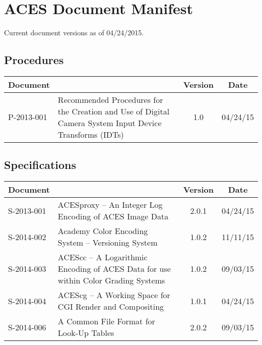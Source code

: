 \documentclass[10pt]{academydoc}
\begin{document}
\regularsectionformat

\section*{ACES Document Manifest}
Current document versions as of 04/24/2015.

\subsection*{Procedures}
\begin{tabularx}{\linewidth}{|l X|c|c|}
\hline
\textbf{Document} & & \textbf{Version} & \textbf{Date} \\ \hline
P-2013-001 & Recommended Procedures for the Creation and Use of Digital Camera System Input Device Transforms (IDTs) & 1.0 & 04/24/15 \\ \hline
\end{tabularx}

\subsection*{Specifications}
\begin{tabularx}{\linewidth}{|l X|c|c|}
\hline
\textbf{Document} & & \textbf{Version} & \textbf{Date} \\ \hline
S-2013-001 & ACESproxy -- An Integer Log Encoding of ACES Image Data & 2.0.1 & 04/24/15 \\ \hline
S-2014-002 & Academy Color Encoding System -- Versioning System & 1.0.2 & 11/11/15 \\ \hline
S-2014-003 & ACEScc -- A Logarithmic Encoding of ACES Data for use within Color Grading Systems & 1.0.2 & 09/03/15 \\ \hline
S-2014-004 & ACEScg -- A Working Space for CGI Render and Compositing & 1.0.1 & 04/24/15 \\ \hline
S-2014-006 & A Common File Format for Look-Up Tables & 2.0.2 & 09/03/15 \\ \hline
\end{tabularx}
\end{document}
